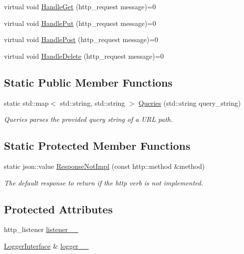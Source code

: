 \begin{DoxyCompactItemize}
virtual void \mbox{\hyperlink{classcadg__rest_1_1_controller_a7166c6b459b4886ec477abd9dee06159}{Handle\+Get}} (http\+\_\+request message)=0
\item 
virtual void \mbox{\hyperlink{classcadg__rest_1_1_controller_a8edfa04d68e8b78759940cd29ff09781}{Handle\+Put}} (http\+\_\+request message)=0
\item 
virtual void \mbox{\hyperlink{classcadg__rest_1_1_controller_ae30a2dd46e5054409b98df686327a9c4}{Handle\+Post}} (http\+\_\+request message)=0
\item 
virtual void \mbox{\hyperlink{classcadg__rest_1_1_controller_a2aa889f1ffb53c6118667f1acf45d611}{Handle\+Delete}} (http\+\_\+request message)=0
\end{DoxyCompactItemize}
\subsection*{Static Public Member Functions}
\begin{DoxyCompactItemize}
\item 
static std\+::map$<$ std\+::string, std\+::string $>$ \mbox{\hyperlink{classcadg__rest_1_1_controller_a6405c6b368ec22d3c870bdd1db92490a}{Queries}} (std\+::string query\+\_\+string)
\begin{DoxyCompactList}\small\item\em Queries parses the provided query string of a U\+RL path. \end{DoxyCompactList}\end{DoxyCompactItemize}
\subsection*{Static Protected Member Functions}
\begin{DoxyCompactItemize}
\item 
static json\+::value \mbox{\hyperlink{classcadg__rest_1_1_controller_ae3bafe4b6830500e7f802853ded2a40d}{Response\+Not\+Impl}} (const http\+::method \&method)
\begin{DoxyCompactList}\small\item\em The default response to return if the http verb is not implemented. \end{DoxyCompactList}\end{DoxyCompactItemize}
\subsection*{Protected Attributes}
\begin{DoxyCompactItemize}
\item 
http\+\_\+listener \mbox{\hyperlink{classcadg__rest_1_1_controller_aaf8ae6c7bdea43d5530e81dd0e8afa44}{listener\+\_\+\+\_\+}}
\item 
\mbox{\hyperlink{classcadg__rest_1_1_logger_interface}{Logger\+Interface}} \& \mbox{\hyperlink{classcadg__rest_1_1_controller_a5eebad0222becb1157f8dd7b9e978c37}{logger\+\_\+\+\_\+}}
\end{DoxyCompactItemize}


